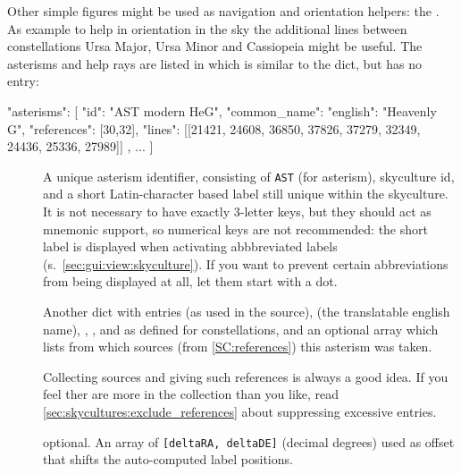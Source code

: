 Other simple figures might be used as navigation and orientation helpers: the . 
As example to help in orientation in the sky the additional lines between constellations 
Ursa Major, Ursa Minor and Cassiopeia might be useful. The asterisms and help rays are listed in
 which is similar to the  dict, but has no  entry:

\begin{jsonfile}[\scriptsize]
"asterisms": [
    {
      "id": "AST modern HeG",
      "common_name": {"english": "Heavenly G", "references": [30,32]},
      "lines": [[21421, 24608, 36850, 37826, 37279, 32349, 24436, 25336, 27989]]
    }, ...
]
\end{jsonfile}

\begin{description}
\item[] A unique asterism identifier, consisting of \texttt{AST} (for asterism), skyculture id, and a short Latin-character based label still unique within the skyculture.
                 It is not necessary to have exactly 3-letter keys, but they should act as mnemonic support, so numerical keys are not recommended:  
				 the short label is displayed when activating abbbreviated labels (s.~\ref{sec:gui:view:skyculture}). If you want to prevent
				 certain abbreviations from being displayed at all, let them start with a dot. 				 
\item[] Another dict with entries  (as used in the source),  (the translatable english name), 
                , ,  and  as defined for constellations,
				and an optional array  which lists from which sources (from \ref{SC:references}) this asterism was taken. 

				Collecting sources and giving such references is always a good idea. If you feel ther are more in the collection than you like, 
				read \ref{sec:skycultures:exclude_references} about suppressing excessive entries.
				
\item[] optional. An array of \texttt{[deltaRA, deltaDE]} (decimal degrees)
                            used as offset that shifts the auto-computed label positions. 
				

\end{description}
